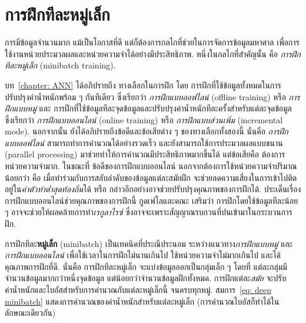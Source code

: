 \section{การฝึกทีละหมู่เล็ก}
\label{sec: minibatch}

การมีข้อมูลจำนวนมาก แม้เป็นโอกาสที่ดี แต่ก็ต้องการกลไกที่ช่วยในการจัดการข้อมูลมหาศาล
เพื่อการใช้งานหน่วยประมวลผลและหน่วยความจำได้อย่างมีประสิทธิภาพ.
หนึ่งในกลไกที่สำคัญนั้น คือ \textit{การฝึกทีละหมู่เล็ก} (minibatch training).

บท~\ref{chapter: ANN} ได้อภิปรายถึง ทางเลือกในการฝึก 
โดย
การฝึกที่ใช้ข้อมูลทั้งหมดในการปรับปรุงค่าน้ำหนักพร้อม ๆ กันทีเดียว ซึ่งเรียกว่า
\textit{การฝึกแบบออฟไลน์} (offline training) หรือ \textit{การฝึกแบบหมู่}
และ
การฝึกที่ใช้ข้อมูลทีละจุดข้อมูลและปรับปรุงค่าน้ำหนักทีละครั้งสำหรับแต่ละจุดข้อมูล ซึ่งเรียกว่า
\textit{การฝึกแบบออนไลน์} (online training) หรือ \textit{การฝึกแบบส่วนเพิ่ม} (incremental mode).
นอกจากนั้น ยังได้อภิปรายถึงข้อดีและข้อเสียต่าง ๆ ของทางเลือกทั้งสองนี้
นั่นคือ \textit{การฝึกแบบออฟไลน์} สามารถทำการคำนวณได้อย่างรวดเร็ว และยังสามารถใช้การประมวลผลแบบขนาน (parallel processing) มาช่วยทำให้การคำนวณมีประสิทธิภาพมากขึ้นได้ แต่ข้อเสียคือ ต้องการหน่วยความจำมาก.
ในขณะที่ ข้อดีของการฝึกแบบออนไลน์ นอกจากต้องการใช้หน่วยความจำปริมาณน้อยกว่า คือ เมื่อทำร่วมกับการสลับลำดับของข้อมูลแต่ละสมัยฝึก จะช่วยลดความเสี่ยงในการเข้าไปติดอยู่ใน\textit{ค่าตัวทำต่ำสุดท้องถิ่น}ได้ หรือ กล่าวอีกอย่างอาจช่วยปรับปรุงคุณภาพของการฝึกได้.
ประเด็นเรื่องการฝึกแบบออนไลน์ช่วยคุณภาพของการฝึกนี้ 
กูดเฟโลและคณะ\cite{GoodfellowEtAl2016} เสริมว่า
การฝึกโดยใช้ข้อมูลทีละน้อย ๆ อาจจะช่วยให้ผลคล้ายการทำ\textit{เรกูลาไรซ์}\cite{WilsonMartinez2003}
ซึ่งอาจจะเพราะสัญญาณรบกวนที่ปนเข้ามาในกระบวนการฝึก.

การฝึกทีละ\textbf{หมู่เล็ก} (minibatch) เป็นเทคนิคที่ประณีประนอม ระหว่างแนวทาง\textit{การฝึกแบบหมู่} และ\textit{การฝึกแบบออนไลน์} เพื่อใช้เวลาในการฝึกไม่นานเกินไป ใช้หน่วยความจำไม่มากเกินไป และได้คุณภาพการฝึกที่ดี.
นั่นคือ การฝึกทีละหมู่เล็ก จะแบ่งข้อมูลออกเป็นกลุ่มเล็ก ๆ 
โดยที่ แต่ละกลุ่มมีจำนวนข้อมูลมากกว่าหนึ่งจุดข้อมูล แต่น้อยกว่าจำนวนข้อมูลฝึกทั้งหมด. 
การฝึกแต่ละ\textit{สมัย} จะปรับค่าน้ำหนักและไบอัสสำหรับการคำนวณกับแต่ละหมู่เล็กนี้ จนครบทุกหมู่.
สมการ~\ref{eq: deep minibatch} แสดงการคำนวณของค่าน้ำหนักสำหรับแต่ละหมู่เล็ก (การคำนวณไบอัสก็ทำได้ในลักษณะเดียวกัน)

